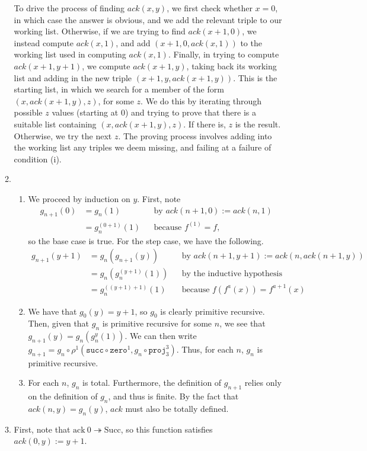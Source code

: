 \documentclass{article}
\begin{document}
\begin{enumerate}
\begin{enumerate}[label=\arabic*.]
        To drive the process of finding $\mathit{ack}(x, y)$, we first check whether $x = 0$, in which case the answer is obvious, and we add the relevant triple to our working list. Otherwise, if we are trying to find $\mathit{ack}(x + 1, 0)$, we instead compute $\mathit{ack}(x, 1)$, and add $(x + 1, 0, \mathit{ack}(x, 1))$ to the working list used in computing $\mathit{ack}(x, 1)$. Finally, in trying to compute $\mathit{ack}(x + 1, y + 1)$, we compute $\mathit{ack}(x + 1, y)$, taking back its working list and adding in the new triple $(x + 1, y, \mathit{ack}(x + 1, y))$. This is the starting list, in which we search for a member of the form $(x, \mathit{ack}(x + 1, y), z)$, for some $z$. We do this by iterating through possible $z$ values (starting at $0$) and trying to prove that there is a suitable list containing $(x, \mathit{ack}(x + 1, y), z)$. If there is, $z$ is the result. Otherwise, we try the next $z$. The proving process involves adding into the working list any triples we deem missing, and failing at a failure of condition (i).
      \item
        \begin{enumerate}
          \item We proceed by induction on $y$. First, note
            \begin{align*}
              g_{n+1}(0)
              & = g_n(1) && \text{by }\mathit{ack}(n+1, 0) := \mathit{ack}(n, 1)
              \\
              & = g_n^{(0+1)}(1) && \text{because }f^{(1)} = f,
            \end{align*}
            so the base case is true. For the step case, we have the following.
            \begin{align*}
              g_{n+1}(y+1)
              & = g_n(g_{n+1}(y)) && \text{by }\mathit{ack}(n+1, y+1) := \mathit{ack}(n, \mathit{ack}(n+1, y))
              \\
              & = g_n(g_n^{(y+1)}(1)) && \text{by the inductive hypothesis}
              \\
              & = g_n^{((y+1)+1)}(1) && \text{because }f(f^a(x)) = f^{a+1}(x)
            \end{align*}
          \item We have that $g_0(y) = y+1$, so $g_0$ is clearly primitive recursive. Then, given that $g_n$ is primitive recursive for some $n$, we see that $g_{n+1}(y) = g_n(g_n^y(1))$. We can then write $g_{n+1} = g_n \circ \rho^1(\mathtt{succ} \circ \mathtt{zero}^1, g_n \circ \mathtt{proj}_3^3)$. Thus, for each $n$, $g_n$ is primitive recursive.
          \item For each $n$, $g_n$ is total. Furthermore, the definition of $g_{n+1}$ relies only on the definition of $g_n$, and thus is finite. By the fact that $\mathit{ack}(n, y) = g_n(y)$, $\mathit{ack}$ must also be totally defined.
        \end{enumerate}
      \item First, note that $\mathrm{ack}~0 \twoheadrightarrow \mathrm{Succ}$, so this function satisfies $\mathit{ack}(0, y) := y + 1$.


\end{enumerate}
\end{enumerate}
\end{document}
